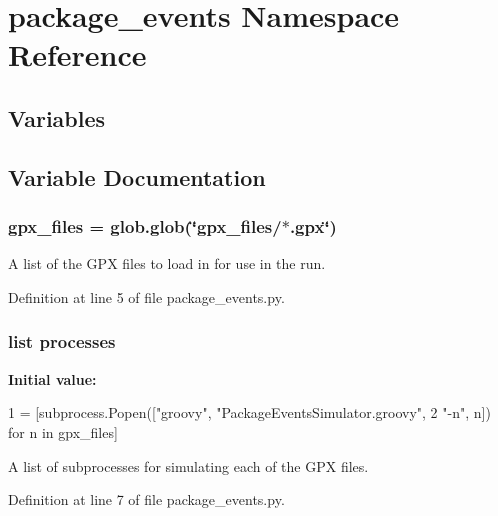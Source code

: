 \hypertarget{namespacepackage__events}{}\section{package\+\_\+events Namespace Reference}
\label{namespacepackage__events}
\subsection*{Variables}


\subsection{Variable Documentation}
\subsubsection[{\texorpdfstring{gpx\+\_\+files}{gpx_files}}]{\setlength{\rightskip}{0pt plus 5cm}gpx\+\_\+files = glob.\+glob(\char`\"{}gpx\+\_\+files/$\ast$.gpx\char`\"{})}\hypertarget{namespacepackage__events_a962f35982bbdbfcd60bc627b6f5c283a}{}\label{namespacepackage__events_a962f35982bbdbfcd60bc627b6f5c283a}


A list of the G\+PX files to load in for use in the run. 



Definition at line 5 of file package\+\_\+events.\+py.

\subsubsection[{\texorpdfstring{processes}{processes}}]{\setlength{\rightskip}{0pt plus 5cm}list processes}\hypertarget{namespacepackage__events_aa17e16eb31b762381c96aa7bfdd6109c}{}\label{namespacepackage__events_aa17e16eb31b762381c96aa7bfdd6109c}
{\bfseries Initial value\+:}
\begin{DoxyCode}
1 = [subprocess.Popen([\textcolor{stringliteral}{"groovy"}, \textcolor{stringliteral}{"PackageEventsSimulator.groovy"},
2                                \textcolor{stringliteral}{"-n"}, n]) \textcolor{keywordflow}{for} n \textcolor{keywordflow}{in} gpx\_files]
\end{DoxyCode}


A list of subprocesses for simulating each of the G\+PX files. 



Definition at line 7 of file package\+\_\+events.\+py.

